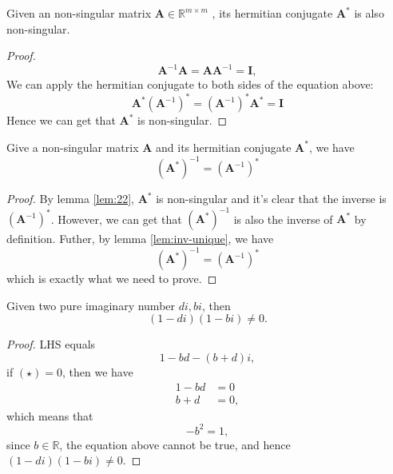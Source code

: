     \begin{lemma}
        Given an non-singular matrix $\bm{A} \in \mathbb{R}^{m\times m}$ , its hermitian conjugate $\bm{A}^{*}$ is also non-singular.
        \begin{proof}
            \[\bm{A}^{-1}\bm{A} = \bm{A}\bm{A}^{-1} = \bm{I},\]
        We can apply the hermitian conjugate to both sides of the equation above:
            \[ \bm{A}^{*} (\bm{A}^{-1})^{*} = (\bm{A}^{-1})^{*}\bm{A}^{*} =  \bm{I}\]
        Hence we can get that $\bm{A}^{*}$ is non-singular.
        \end{proof}
        \label{lem:22}
    \end{lemma} 
    
    \begin{lemma}
    Give a non-singular matrix $\bm{A}$ and its hermitian conjugate $\bm{A}^{*}$, we have
    \[(\bm{A}^{*})^{-1} = (\bm{A}^{-1})^{*}\]
    \end{lemma}
    \begin{proof}
    By lemma \ref{lem:22}, $\bm{A}^{*}$ is non-singular and it's clear that the inverse is $(\bm{A}^{-1})^{*}$. However, we can get that $(\bm{A}^{*})^{-1}$ is also the inverse of $\bm{A}^{*}$ by definition.
    Futher, by lemma \ref{lem:inv-unique}, we have
    $$
    (\bm{A}^{*})^{-1} = (\bm{A}^{-1})^{*}
    $$
    which is exactly what we need to prove.
    \end{proof}
    
    \begin{lemma}
    Given two pure imaginary number $di, bi$, then 
    $$
    (1-di) (1-bi) \neq 0.
    $$
    \begin{proof}
    LHS equals
    \begin{equation*}
    1-bd - (b+d)i, \tag{$\star$}
    \end{equation*}
    if $(\star) = 0$, then we have
    $$
    \begin{aligned}
    1 - bd &= 0 \\
    b+d &=0,
    \end{aligned}
    $$
    which means that
    $$
    -b^2 = 1,
    $$
    since $b \in \mathbb{R}$, the equation above cannot be true, and hence $(1-di)(1-bi) \neq 0$.
    \end{proof}
    \end{lemma}

